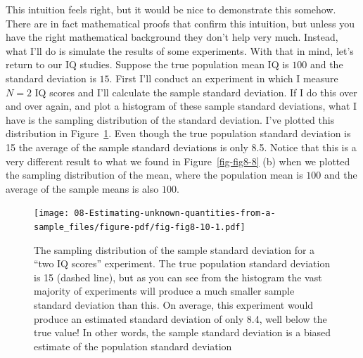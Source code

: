 \documentclass[
  a4paper,
]{book}
\begin{document}
This intuition feels right, but it would be nice to demonstrate this
somehow. There are in fact mathematical proofs that confirm this
intuition, but unless you have the right mathematical background they
don't help very much. Instead, what I'll do is simulate the results of
some experiments. With that in mind, let's return to our IQ studies.
Suppose the true population mean IQ is \(100\) and the standard
deviation is \(15\). First I'll conduct an experiment in which I measure
\(N = 2\) IQ scores and I'll calculate the sample standard deviation. If
I do this over and over again, and plot a histogram of these sample
standard deviations, what I have is the sampling distribution of the
standard deviation. I've plotted this distribution in
Figure~\ref{fig-fig8-10}. Even though the true population standard
deviation is 15 the average of the sample standard deviations is only
8.5. Notice that this is a very different result to what we found in
Figure~\ref{fig-fig8-8} (b) when we plotted the sampling distribution of
the mean, where the population mean is \(100\) and the average of the
sample means is also \(100\).

\begin{figure}

\texttt{[image: 08-Estimating-unknown-quantities-from-a-sample\_files/figure-pdf/fig-fig8-10-1.pdf]} \hfill{}

\caption{\label{fig-fig8-10}The sampling distribution of the sample
standard deviation for a ``two IQ scores'' experiment. The true
population standard deviation is 15 (dashed line), but as you can see
from the histogram the vast majority of experiments will produce a much
smaller sample standard deviation than this. On average, this experiment
would produce an estimated standard deviation of only 8.4, well below
the true value! In other words, the sample standard deviation is a
biased estimate of the population standard deviation}

\end{figure}
\end{document}
